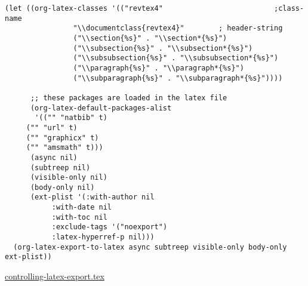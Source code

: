 \documentclass{revtex4}
\begin{document}
\begin{verbatim}
(let ((org-latex-classes '(("revtex4"                          ;class-name
			    "\\documentclass{revtex4}"        ; header-string
			    ("\\section{%s}" . "\\section*{%s}")
			    ("\\subsection{%s}" . "\\subsection*{%s}")
			    ("\\subsubsection{%s}" . "\\subsubsection*{%s}")
			    ("\\paragraph{%s}" . "\\paragraph*{%s}")
			    ("\\subparagraph{%s}" . "\\subparagraph*{%s}"))))

      ;; these packages are loaded in the latex file
      (org-latex-default-packages-alist 
       '(("" "natbib" t)
	 ("" "url" t)
	 ("" "graphicx" t)
	 ("" "amsmath" t)))
      (async nil)
      (subtreep nil)
      (visible-only nil)
      (body-only nil)
      (ext-plist '(:with-author nil				
		   :with-date nil
		   :with-toc nil
		   :exclude-tags '("noexport")
		   :latex-hyperref-p nil)))
  (org-latex-export-to-latex async subtreep visible-only body-only ext-plist))
\end{verbatim}

\url{controlling-latex-export.tex}
\end{document}
